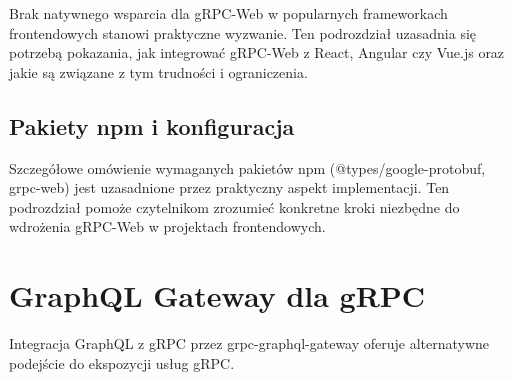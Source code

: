 Brak natywnego wsparcia dla gRPC-Web w popularnych frameworkach frontendowych stanowi praktyczne wyzwanie. Ten podrozdział uzasadnia się potrzebą pokazania, jak integrować gRPC-Web z React, Angular czy Vue.js oraz jakie są związane z tym trudności i ograniczenia.

\subsection{Pakiety npm i konfiguracja}
\label{subsec:PakietyNPM}

Szczegółowe omówienie wymaganych pakietów npm (@types/google-protobuf, grpc-web) jest uzasadnione przez praktyczny aspekt implementacji. Ten podrozdział pomoże czytelnikom zrozumieć konkretne kroki niezbędne do wdrożenia gRPC-Web w projektach frontendowych.

\section{GraphQL Gateway dla gRPC}
\label{sec:GraphQLGateway}

Integracja GraphQL z gRPC przez grpc-graphql-gateway oferuje alternatywne podejście do ekspozycji usług gRPC.
